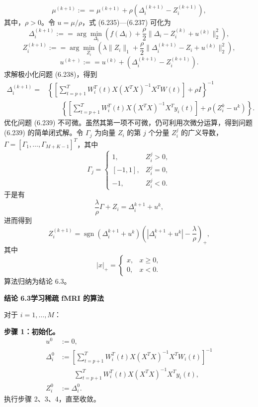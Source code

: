 \begin{equation}
\mu^{(k+1)}:==\mu^{(k+1)}+\rho(\Delta_i^{(k+1)}-Z_i^{(k+1)}),
\tag{6.237}
\end{equation}
其中，$\rho>0$。令 $u=\mu/\rho$，式 (6.235)—(6.237) 可化为
\begin{equation}
\Delta_i^{(k+1)}:==\arg\min_{\Delta_i}\left(f(\Delta_i)+\frac\rho2\lVert\Delta_i-Z_i^{(k)}+u^{(k)}\rVert_2^2\right),
\tag{6.238}
\end{equation}
\begin{equation}
Z_i^{(k+1)}:==\arg\min_{Z_i}\left(\lambda\lVert Z_i\rVert_1+\frac\rho2\lVert\Delta_i^{(k+1)}-Z_i+u^{(k)}\rVert_2^2\right),
\tag{6.239}
\end{equation}
\begin{equation}
u^{(k+)}:==u^{(k)}+(\Delta_i^{(k+1)}-Z_i^{(k+1)}).
\tag{6.240}
\end{equation}
求解极小化问题 (6.238)，得到
\[
\begin{aligned}
\Delta_i^{(k+1)}=&\left\{\left[\sum_{t=p+1}^TW_i^T(t)X(X^TX)^{-1}X^TW(t)\right]+\rho I\right\}^{-1}\\
&\qquad\left\{\left[\sum_{t=p+1}^TW_i^T(t)X(X^TX)^{-1}X^Ty_i(t)\right]+\rho(Z_i^k-u^k)\right\}.
\end{aligned}
\]
优化问题 (6.239) 不可微。虽然其第一项不可微，仍可利用次微分运算，得到问题 (6.239) 的简单闭式解。令 $\Gamma_j$ 为向量 $Z_i$ 的第 $j$ 个分量 $Z_i^j$ 的广义导数，$\Gamma=[\Gamma_1,\ldots,\Gamma_{M+K-1}]^T$，其中
\[
\Gamma_j=\begin{cases}1,&Z_i^j>0,\\{}[-1,1],&Z_i^j=0,\\-1,&Z_i^j<0.\end{cases}
\]
于是有
\[
\frac\lambda\rho\Gamma+Z_i=\Delta_i^{k+1}+u^k,
\]
进而得到
\begin{equation}
Z_i^{(k+1)}=\operatorname{sgn}(\Delta_i^{k+1}+u^k)\left(|\Delta_i^{k+1}+u^k|-\frac\lambda\rho\right)_+,
\tag{6.241}
\end{equation}
其中
\[
|x|_+=\begin{cases}x,&x\geq0,\\0,&x<0.\end{cases}
\]
算法归纳为结论 6.3。

\noindent\textbf{结论 6.3\quad 学习稀疏 fMRI 的算法}

对于 $i=1,\ldots,M$：

\noindent\textbf{步骤 1：初始化。}
\[
\begin{aligned}
u^0&:=0,\\
\Delta_i^0&:=\left[\sum_{t=p+1}^TW_i^T(t)X(X^TX)^{-1}X^TW_i(t)\right]^{-1}\\
&\qquad\sum_{t=p+1}^TW_i^T(t)X(X^TX)^{-1}X^Ty_i(t),\\
Z_i^0&:=\Delta_i^0.
\end{aligned}
\]
执行步骤 2、3、4，直至收敛。

